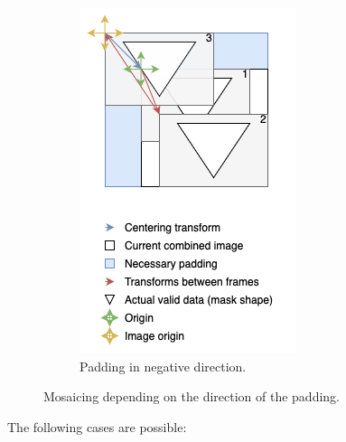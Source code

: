 \begin{figure}[H]
\begin{subfigure}[b]{.45\textwidth}
        \includegraphics[width=\textwidth]{figures/mosaicing/Centering.png}
        \caption{Padding in negative direction.}
        \label{sfig:mosaic-negative}
    \end{subfigure}
    \caption{Mosaicing depending on the direction of the padding.}
    \label{fig:mosaicing}
\end{figure}

The following cases are possible:

